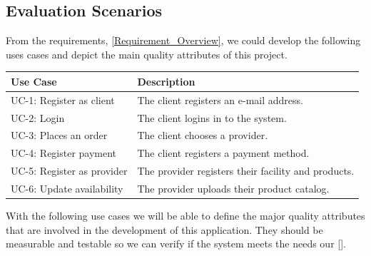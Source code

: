 \subsection{Evaluation Scenarios} \label{table_use_case}
From the requirements, \ref{Requirement_Overview}, we could develop the following uses cases and depict the main quality 
attributes of this project. 

\begin{table}[H]    
    \begin{tabularx}{\textwidth}{lX}
    \toprule
    Use Case & Description  \\
    \midrule
    UC-1: Register as \gls{client} & The \gls{client} registers an e-mail address.\\
    UC-2: Login & The \gls{client} logins in to the system. \\
    UC-3: Places an order & The \gls{client} chooses a \gls{provider}. \\
    UC-4: Register payment & The \gls{client} registers a payment method. \\
    UC-5: Register as \gls{provider} & The \gls{provider} registers their facility and products. \\
    UC-6: Update availability & The \gls{provider} uploads their product catalog. \\
    \bottomrule
    \end{tabularx}
\end{table}

With the following use cases we will  be able to define the major quality attributes that are involved in the 
development of this application. They should be measurable and testable so we can verify if the system meets 
the needs our  [\cite{refbook:DSHC}].

